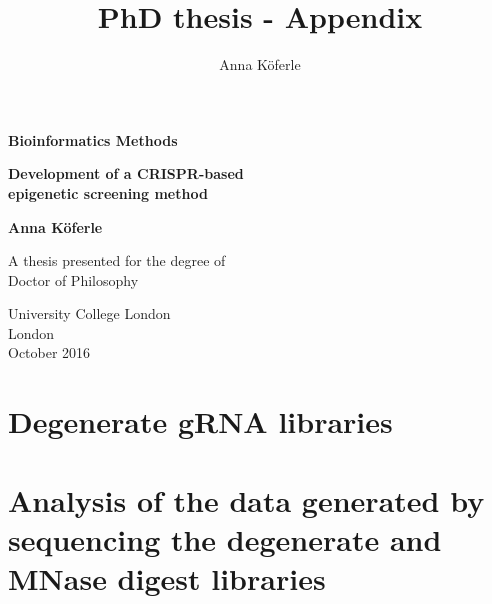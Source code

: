 \documentclass[12pt]{report}
\begin{document}
\title{PhD thesis - Appendix}
\author{Anna Köferle}

\begin{titlepage}
    \begin{center}
        \vspace*{3cm}
        
		\begin{Huge}
		\textbf{Bioinformatics Methods}
		\end{Huge}   
		 \vspace{3cm}      
		 
		 
		\begin{Huge}
		\textbf{Development of a CRISPR-based \\ epigenetic screening method}
		\end{Huge}        
		
        \vspace{3.cm}      
        
        {\Large \textbf{Anna Köferle}}
        
        \vfill
        
        A thesis presented for the degree of\\
        Doctor of Philosophy
        
        \vspace{1.5cm}
        
        
        University College London\\
        London\\
        October 2016\\
        
        
    \end{center}
\end{titlepage}

\onehalfspacing

\tableofcontents


\chapter{Degenerate gRNA libraries}
\label{ch:degenerate-libraries}


\chapter{Analysis of the data generated by sequencing the degenerate and MNase digest libraries}
\label{ch:libraries-analysis}

\end{document}
